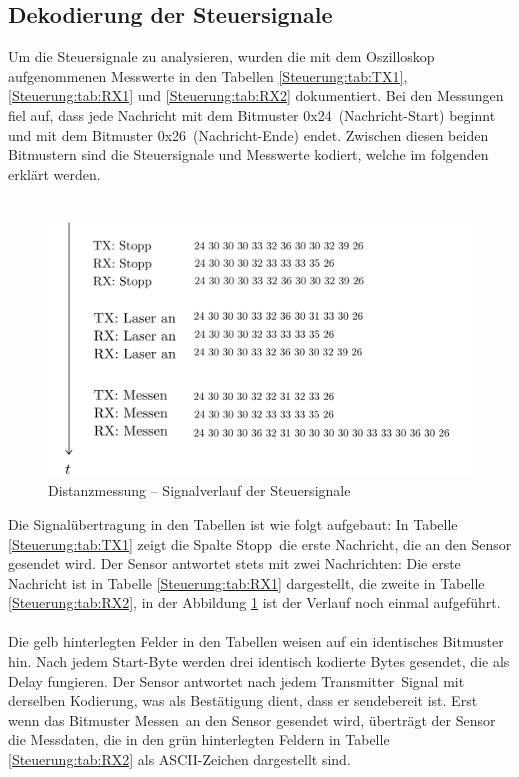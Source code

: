 \subsection{Dekodierung der Steuersignale}
\label{Distanzmessung:Kodierung}
Um die Steuersignale zu analysieren, wurden die mit dem Oszilloskop aufgenommenen Messwerte in den Tabellen \ref{Steuerung:tab:TX1}, \ref{Steuerung:tab:RX1} und \ref{Steuerung:tab:RX2} dokumentiert. Bei den Messungen fiel auf, dass jede Nachricht mit dem Bitmuster \frqq 0x24\flqq\ (Nachricht-Start) beginnt und mit dem Bitmuster \frqq 0x26\flqq\ (Nachricht-Ende) endet. Zwischen diesen beiden Bitmustern sind die Steuersignale und Messwerte kodiert, welche im folgenden erklärt werden.\\
\
\pagebreak[4]
\begin{figure}[!ht]
	\begin{center}
		\includegraphics[width=1\textwidth]{img/2_sen/dis_parkside_signalverlauf.png}
		\caption{Distanzmessung – Signalverlauf der Steuersignale}
		\label{Kodierung:pic:signalverlauf}
	\end{center}
\end{figure}
\pagebreak[1]
Die Signalübertragung in den Tabellen ist wie folgt aufgebaut: In Tabelle \ref{Steuerung:tab:TX1} zeigt die Spalte \frqq Stopp\flqq\ die erste Nachricht, die an den Sensor gesendet wird. Der Sensor antwortet stets mit zwei Nachrichten: Die erste Nachricht ist in Tabelle \ref{Steuerung:tab:RX1} dargestellt, die zweite in Tabelle \ref{Steuerung:tab:RX2}, in der Abbildung \ref{Kodierung:pic:signalverlauf} ist der Verlauf noch einmal aufgeführt.\\ \ \\
Die gelb hinterlegten Felder in den Tabellen weisen auf ein identisches Bitmuster hin. Nach jedem Start-Byte werden drei identisch kodierte Bytes gesendet, die als Delay fungieren. Der Sensor antwortet nach jedem \frqq Transmitter\flqq\ Signal mit derselben Kodierung, was als Bestätigung dient, dass er sendebereit ist. Erst wenn das Bitmuster \frqq Messen\flqq\ an den Sensor gesendet wird, überträgt der Sensor die Messdaten, die in den grün hinterlegten Feldern in Tabelle \ref{Steuerung:tab:RX2} als ASCII-Zeichen dargestellt sind.


